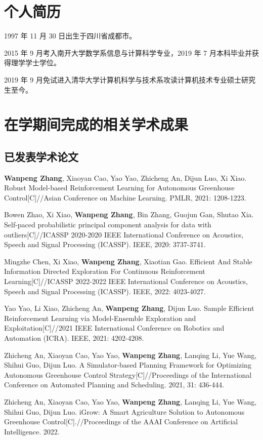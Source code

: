 
\begin{resume}

  \section*{个人简历}

  1997 年 11 月 30 日出生于四川省成都市。

  2015 年 9 月考入南开大学数学系信息与计算科学专业，2019 年 7 月本科毕业并获得理学学士学位。

  2019 年 9 月免试进入清华大学计算机科学与技术系攻读计算机技术专业硕士研究生至今。


  \section*{在学期间完成的相关学术成果}

  \subsection*{已发表学术论文}

  \begin{achievements}
    \item \textbf{Wanpeng Zhang}, Xiaoyan Cao, Yao Yao, Zhicheng An, Dijun Luo, Xi Xiao. Robust Model-based Reinforcement Learning for Autonomous Greenhouse Control[C]//Asian Conference on Machine Learning. PMLR, 2021: 1208-1223.
    \item Bowen Zhao, Xi Xiao, \textbf{Wanpeng Zhang}, Bin Zhang, Guojun Gan, Shutao Xia. Self-paced probabilistic principal component analysis for data with outliers[C]//ICASSP 2020-2020 IEEE International Conference on Acoustics, Speech and Signal Processing (ICASSP). IEEE, 2020: 3737-3741.
    \item Mingzhe Chen, Xi Xiao, \textbf{Wanpeng Zhang}, Xiaotian Gao. Efficient And Stable Information Directed Exploration For Continuous Reinforcement Learning[C]//ICASSP 2022-2022 IEEE International Conference on Acoustics, Speech and Signal Processing (ICASSP). IEEE, 2022: 4023-4027.
    \item Yao Yao, Li Xiao, Zhicheng An, \textbf{Wanpeng Zhang}, Dijun Luo. Sample Efficient Reinforcement Learning via Model-Ensemble Exploration and Exploitation[C]//2021 IEEE International Conference on Robotics and Automation (ICRA). IEEE, 2021: 4202-4208.
    \item Zhicheng An, Xiaoyan Cao, Yao Yao, \textbf{Wanpeng Zhang}, Lanqing Li, Yue Wang, Shihui Guo, Dijun Luo. A Simulator-based Planning Framework for Optimizing Autonomous Greenhouse Control Strategy[C]//Proceedings of the International Conference on Automated Planning and Scheduling. 2021, 31: 436-444.
    \item Zhicheng An, Xiaoyan Cao, Yao Yao, \textbf{Wanpeng Zhang}, Lanqing Li, Yue Wang, Shihui Guo, Dijun Luo. iGrow: A Smart Agriculture Solution to Autonomous Greenhouse Control[C].//Proceedings of the AAAI Conference on Artificial Intelligence. 2022.
  \end{achievements}
  

\end{resume}
